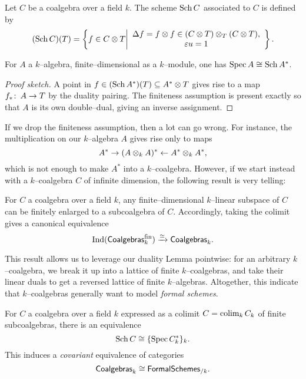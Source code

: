 \begin{definition}
Let $C$ be a coalgebra over a field $k$.  The scheme $\operatorname{Sch} C$ associated to $C$ is defined by \[(\operatorname{Sch} C)(T) = \left\{f \in C \otimes T \middle| \begin{array}{c} \Delta f = f \otimes f \in (C \otimes T) \otimes_T (C \otimes T), \\ \varepsilon u = 1 \end{array} \right\}.\]
\end{definition}

\begin{lemma}
For $A$ a $k$--algebra, finite--dimensional as a $k$--module, one has $\operatorname{Spec} A \cong \operatorname{Sch} A^*$.
\end{lemma}
\begin{proof}[Proof sketch]
A point in $f \in (\operatorname{Sch} A^*)(T) \subseteq A^* \otimes T$ gives rise to a map $f_*\colon\thinspace A \to T$ by the duality pairing.  The finiteness assumption is present exactly so that $A$ is its own double--dual, giving an inverse assignment.
\end{proof}

If we drop the finiteness assumption, then a lot can go wrong.  For instance, the multiplication on our $k$--algebra $A$ gives rise only to maps \[A^* \to (A \otimes_k A)^* \leftarrow A^* \otimes_k A^*,\] which is not enough to make $A^*$ into a $k$--coalgebra.  However, if we start instead with a $k$--coalgebra $C$ of infinite dimension, the following result is very telling:

\begin{lemma}\label{kCoalgebrasAreIndFinite}
For $C$ a coalgebra over a field $k$, any finite--dimensional $k$--linear subspace of $C$ can be finitely enlarged to a subcoalgebra of $C$.  Accordingly, taking the colimit gives a canonical equivalence \[\Ind(\CatOf{Coalgebras}_k^{\mathrm{fin}}) \xrightarrow{\simeq} \CatOf{Coalgebras}_k. \qed\]
\end{lemma}

\noindent This result allows us to leverage our duality Lemma pointwise: for an arbitrary $k$--coalgebra, we break it up into a lattice of finite $k$--coalgebras, and take their linear duals to get a reversed lattice of finite $k$--algebras.  Altogether, this indicate that $k$--coalgebras generally want to model \emph{formal schemes}.

\begin{corollary}\label{CoalgsAndFSchsAgreeOverk}
For $C$ a coalgebra over a field $k$ expressed as a colimit $C = \operatorname*{colim}_k C_k$ of finite subcoalgebras, there is an equivalence \[\operatorname{Sch} C \cong \{\operatorname{Spec} C_k^*\}_k.\]  This induces a \emph{covariant} equivalence of categories \[\CatOf{Coalgebras}_k \cong \CatOf{FormalSchemes}_{/k}. \qed\]
\end{corollary}

